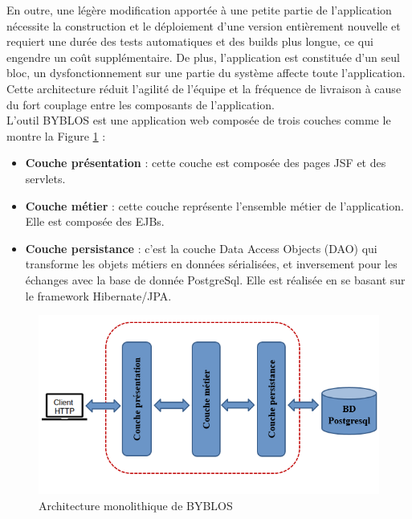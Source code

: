 En outre, une légère modification apportée à une petite partie de l’application nécessite la construction et le déploiement d'une version entièrement nouvelle et requiert une durée des tests automatiques et des builds plus longue, ce qui engendre un coût supplémentaire. De plus, l'application est constituée d'un seul bloc, un dysfonctionnement sur une partie du système affecte toute l’application. Cette architecture réduit l'agilité de l’équipe et la fréquence de livraison à cause du fort couplage entre les composants de l'application.\\
L'outil BYBLOS est une application web composée de trois couches comme le montre la Figure \ref{fig:architecure BYBLOS existante} :
\begin{itemize}
    \item \textbf{Couche présentation} : cette couche est composée des pages JSF et des servlets.
    \item \textbf{Couche métier} : cette couche représente l’ensemble métier de l’application. Elle est composée des EJBs.
    \item \textbf{Couche persistance} : c'est la couche Data Access Objects (DAO) qui transforme les objets métiers en données sérialisées, et inversement pour les échanges avec la base de donnée PostgreSql. Elle est réalisée en se basant sur le framework Hibernate/JPA.
\end{itemize}
\begin{figure}[H]
    \centering
    \includegraphics[scale=0.8]{img/archi mono byblos.PNG}
    \caption{Architecture monolithique de BYBLOS}
    \label{fig:architecure BYBLOS existante}
\end{figure}
